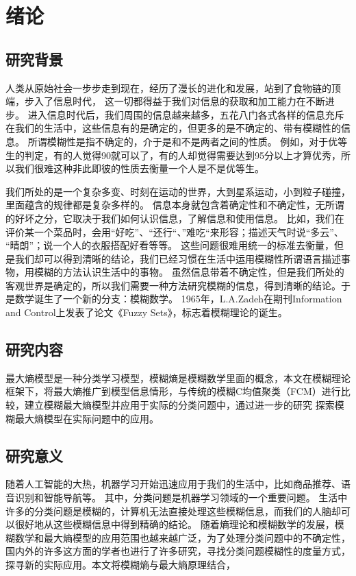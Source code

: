 \chapter[绪论]{绪论}
\section{ 研究背景}
\par
人类从原始社会一步步走到现在，经历了漫长的进化和发展，站到了食物链的顶端，步入了信息时代，
这一切都得益于我们对信息的获取和加工能力在不断进步。
进入信息时代后，我们周围的信息越来越多，五花八门各式各样的信息充斥在我们的生活中，这些信息有的是确定的，但更多的是不确定的、带有模糊性的信息。
所谓模糊性是指不确定的，介于是和不是两者之间的性质。
例如，对于优等生的判定，有的人觉得90就可以了，有的人却觉得需要达到95分以上才算优秀，所以我们很难这种非此即彼的性质去衡量一个人是不是优等生。
\par
我们所处的是一个复杂多变、时刻在运动的世界，大到星系运动，小到粒子碰撞，里面蕴含的规律都是复杂多样的。
信息本身就包含着确定性和不确定性，无所谓的好坏之分，它取决于我们如何认识信息，了解信息和使用信息。
比如，我们在评价某一个菜品时，会用“好吃”、“还行“、”难吃“来形容；描述天气时说“多云”、 “晴朗”；说一个人的衣服搭配好看等等。
这些问题很难用统一的标准去衡量，但是我们却可以得到清晰的结论，我们已经习惯在生活中运用模糊性所谓语言描述事物，用模糊的方法认识生活中的事物。
虽然信息带着不确定性，但是我们所处的客观世界是确定的，所以我们需要一种方法研究模糊的信息，得到清晰的结论。于是数学诞生了一个新的分支：模糊数学。
1965年，L.A.Zadeh在期刊Information and Control上发表了论文《Fuzzy Sets》，标志着模糊理论的诞生。
\section{研究内容}
最大熵模型是一种分类学习模型，模糊熵是模糊数学里面的概念，本文在模糊理论框架下，将最大熵推广到模型信息情形，与传统的模糊C均值聚类（FCM）进行比较，建立模糊最大熵模型并应用于实际的分类问题中，通过进一步的研究 探索模糊最大熵模型在实际问题中的应用。
\section{研究意义}
随着人工智能的大热，机器学习开始迅速应用于我们的生活中，比如商品推荐、语音识别和智能导航等。
其中，分类问题是机器学习领域的一个重要问题。
生活中许多的分类问题是模糊的，计算机无法直接处理这些模糊信息，而我们的人脑却可以很好地从这些模糊信息中得到精确的结论。
随着熵理论和模糊数学的发展，模糊数学和最大熵模型的应用范围也越来越广泛，为了处理分类问题中的不确定性，国内外的许多这方面的学者也进行了许多研究，寻找分类问题模糊性的度量方式，探寻新的实际应用。本文将模糊熵与最大熵原理结合，